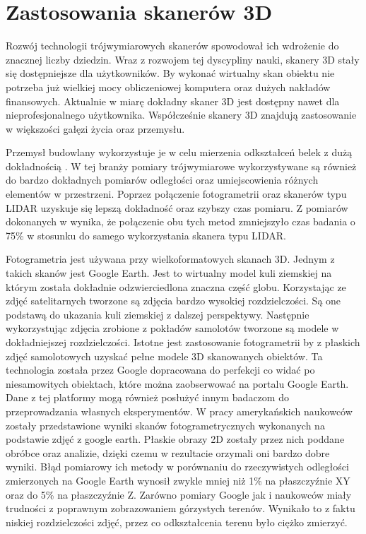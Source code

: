 \section{Zastosowania skanerów 3D}
Rozwój technologii trójwymiarowych skanerów spowodował ich wdrożenie do znacznej liczby dziedzin. Wraz z rozwojem tej dyscypliny nauki, skanery 3D stały się dostępniejsze dla użytkowników. By wykonać wirtualny skan obiektu nie potrzeba już wielkiej mocy obliczeniowej komputera oraz dużych nakładów finansowych. Aktualnie w miarę dokładny skaner 3D jest dostępny nawet dla nieprofesjonalnego użytkownika.
Współcześnie skanery 3D znajdują zastosowanie w większości gałęzi życia oraz przemysłu. 

Przemysł budowlany wykorzystuje je w celu mierzenia odkształceń belek z dużą dokładnością \cite{goszczynska2014doswiadczalna}. W tej branży pomiary trójwymiarowe wykorzystywane są również do bardzo dokładnych pomiarów odległości oraz umiejscowienia różnych elementów w przestrzeni. Poprzez połączenie fotogrametrii oraz skanerów typu LIDAR uzyskuje się lepszą dokładność oraz szybszy czas pomiaru. Z pomiarów dokonanych w \cite{el2008integrating} wynika, że połączenie obu tych metod zmniejszyło czas badania o 75\% w stosunku do samego wykorzystania skanera typu LIDAR.

Fotogrametria jest używana przy wielkoformatowych skanach 3D. Jednym z takich skanów jest Google Earth. Jest to wirtualny model kuli ziemskiej na którym została dokładnie odzwierciedlona znaczna część globu. Korzystając ze zdjęć satelitarnych tworzone są zdjęcia bardzo wysokiej rozdzielczości. Są one podstawą do ukazania kuli ziemskiej z dalszej perspektywy. Następnie wykorzystując zdjęcia zrobione z pokładów samolotów tworzone są modele w dokładniejszej rozdzielczości. Istotne jest zastosowanie fotogrametrii by z płaskich zdjęć samolotowych uzyskać pełne modele 3D skanowanych obiektów. Ta technologia została przez Google dopracowana do perfekcji co widać po niesamowitych obiektach, które można zaobserwować na portalu Google Earth. Dane z tej platformy mogą również posłużyć innym badaczom do przeprowadzania własnych eksperymentów. W pracy amerykańskich naukowców \cite{inproceedings} zostały przedstawione wyniki skanów fotogrametrycznych wykonanych na podstawie zdjęć z google earth. Płaskie obrazy 2D zostały przez nich poddane obróbce oraz analizie, dzięki czemu w rezultacie orzymali oni bardzo dobre wyniki. Błąd pomiarowy ich metody w porównaniu do rzeczywistych odległości zmierzonych na Google Earth wynosił zwykle mniej niż 1\% na płaszczyźnie XY oraz do 5\% na płaszczyźnie Z. Zarówno pomiary Google jak i naukowców miały trudności z poprawnym zobrazowaniem górzystych terenów. Wynikało to z faktu niskiej rozdzielczości zdjęć, przez co odkształcenia terenu było ciężko zmierzyć.

